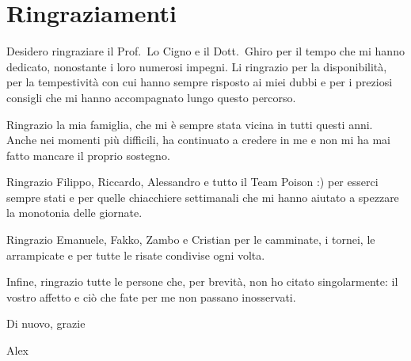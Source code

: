 \section*{Ringraziamenti}

\noindent
Desidero ringraziare il Prof.\ Lo Cigno e il Dott.\ Ghiro per il tempo che mi hanno dedicato, nonostante i loro numerosi impegni. Li ringrazio per la disponibilità, per la tempestività con cui hanno sempre risposto ai miei dubbi e per i preziosi consigli che mi hanno accompagnato lungo questo percorso.

\vspace{\baselineskip}

\noindent
Ringrazio la mia famiglia, che mi è sempre stata vicina in tutti questi anni. Anche nei momenti più difficili, ha continuato a credere in me e non mi ha mai fatto mancare il proprio sostegno.

\vspace{\baselineskip}

\noindent
Ringrazio Filippo, Riccardo, Alessandro e tutto il Team Poison :) per esserci sempre stati e per quelle chiacchiere settimanali che mi hanno aiutato a spezzare la monotonia delle giornate.

\vspace{\baselineskip}

\noindent
Ringrazio Emanuele, Fakko, Zambo e Cristian per le camminate, i tornei, le arrampicate e per tutte le risate condivise ogni volta.

\vspace{\baselineskip}

\noindent
Infine, ringrazio tutte le persone che, per brevità, non ho citato singolarmente: il vostro affetto e ciò che fate per me non passano inosservati.

\vspace{\baselineskip}

\begin{flushright}
Di nuovo, grazie

Alex
\end{flushright}